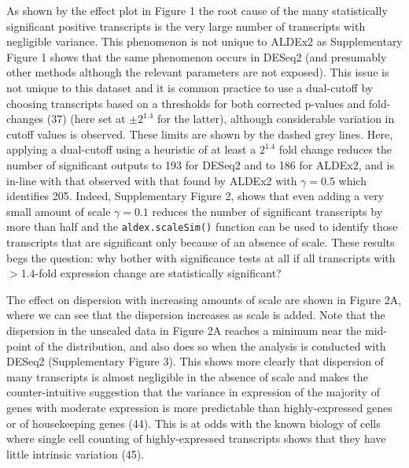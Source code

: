 \documentclass[
]{article}
\begin{document}
As shown by the effect plot in Figure 1 the root cause of the many
statistically significant positive transcripts is the very large number
of transcripts with negligible variance. This phenomenon is not unique
to ALDEx2 as Supplementary Figure 1 shows that the same phenomenon
occurs in DESeq2 (and presumably other methods although the relevant
parameters are not exposed). This issue is not unique to this dataset
and it is common practice to use a dual-cutoff by choosing transcripts
based on a thresholds for both corrected p-values and fold-changes (37)
(here set at \(\pm 2^{1.4}\) for the latter), although considerable
variation in cutoff values is observed. These limits are shown by the
dashed grey lines. Here, applying a dual-cutoff using a heuristic of at
least a \(2^{1.4}\) fold change reduces the number of significant
outputs to 193 for DESeq2 and to 186 for ALDEx2, and is in-line with
that observed with that found by ALDEx2 with \(\gamma = 0.5\) which
identifies 205. Indeed, Supplementary Figure 2, shows that even adding a
very small amount of scale \(\gamma = 0.1\) reduces the number of
significant transcripts by more than half and the
\texttt{aldex.scaleSim()} function can be used to identify those
transcripts that are significant only because of an absence of scale.
These results begs the question: why bother with significance tests at
all if all transcripts with \(> 1.4\)-fold expression change are
statistically significant?

The effect on dispersion with increasing amounts of scale are shown in
Figure 2A, where we can see that the dispersion increases as scale is
added. Note that the dispersion in the unscaled data in Figure 2A
reaches a minimum near the mid-point of the distribution, and also does
so when the analysis is conducted with DESeq2 (Supplementary Figure 3).
This shows more clearly that dispersion of many transcripts is almost
negligible in the absence of scale and makes the counter-intuitive
suggestion that the variance in expression of the majority of genes with
moderate expression is more predictable than highly-expressed genes or
of housekeeping genes (44). This is at odds with the known biology of
cells where single cell counting of highly-expressed transcripts shows
that they have little intrinsic variation (45).
\end{document}
